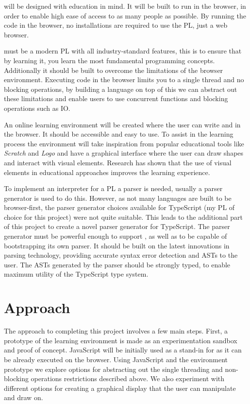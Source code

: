 \Setanta{} will be designed with education in mind. It will be built to run in the browser, in order to enable high ease of access to as many people as possible. By running the code in the browser, no installations are required to use the PL, just a web browser.

\Setanta{} must be a modern PL with all industry-standard features, this is to ensure that by learning it, you learn the most fundamental programming concepts. Additionally it should be built to overcome the limitations of the browser environment. Executing code in the browser limits you to a single thread and no blocking operations, by building a language on top of this we can abstract out these limitations and enable users to use concurrent functions and blocking operations such as IO.

An online learning environment will be created where the user can write and \Setanta{} in the browser. It should be accessible and easy to use. To assist in the learning process the environment will take inspiration from popular educational tools like \emph{Scratch} and \emph{Logo} and have a graphical interface where the user can draw shapes and interact with visual elements. Research has shown that the use of visual elements in educational approaches improves the learning experience\cite{graphiclearning}.

To implement an interpreter for a PL a parser is needed, usually a parser generator is used to do this. However, as not many languages are built to be browser-first, the parser generator choices available for TypeScript (my PL of choice for this project) were not quite suitable. This leads to the additional part of this project to create a novel parser generator for TypeScript. The parser generator must be powerful enough to support \Setanta{}, as well as to be capable of bootstrapping its own parser. It should be built on the latest innovations in parsing technology, providing accurate syntax error detection and ASTs to the user. The ASTs generated by the parser should be strongly typed, to enable maximum utility of the TypeScript type system.

\section{Approach}
The approach to completing this project involves a few main steps. First, a prototype of the learning environment is made as an experimentation sandbox and proof of concept. JavaScript will be initially used as a stand-in for \Setanta{} as it can be already executed on the browser. Using JavaScript and the environment prototype we explore options for abstracting out the single threading and non-blocking operations restrictions described above. We also experiment with different options for creating a graphical display that the user can manipulate and draw on.

